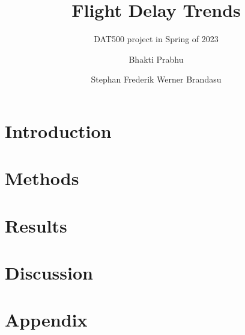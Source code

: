 \documentclass[sigconf]{acmart}
\begin{document}
\title{Flight Delay Trends}
\subtitle{DAT500 project in Spring of 2023}

\author{Bhakti Prabhu}
\author{Stephan Frederik Werner Brandasu}



\begin{abstract}

\end{abstract}


\maketitle


\section{Introduction}
\label{sec:introduction}


\section{Methods}
\label{sec:methods}


\section{Results}
\label{sec:results}


\section{Discussion}
\label{sec:discussion}


\appendix
\section{Appendix}




\end{document}
